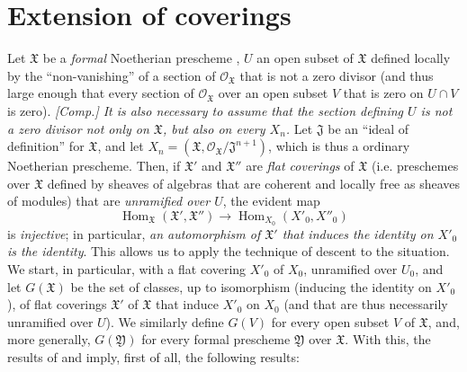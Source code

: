 \documentclass{article}
\newcommand{\scr}[1]{{\mathscr{#1}}}
\newcommand{\fk}[1]{{\mathfrak{#1}}}
\DeclareMathOperator{\Hom}{Hom}
\newcommand{\oldpage}[1]{\marginpar{\footnotesize$\Big\vert$ \textit{p.~#1}}}
\begin{document}
\section{Extension of coverings}
\label{C.5}

Let $\fk{X}$ be a \emph{formal} Noetherian prescheme \cite{2}, $U$ an open subset of $\fk{X}$ defined locally by the ``non-vanishing'' of a section of $\scr{O}_\fk{X}$ that is not a zero divisor (and thus large enough that every section of $\scr{O}_\fk{X}$ over an open subset $V$ that is zero on $U\cap V$ is zero).
\emph{[Comp.] It is also necessary to assume that the section defining $U$ is not a zero divisor not only on $\fk{X}$, but also on every $X_n$.}
Let $\fk{J}$ be an ``ideal of definition'' for $\fk{X}$, and let $X_n=(\fk{X},\scr{O}_\fk{X}/\fk{J}^{n+1})$, which is thus a ordinary Noetherian prescheme.
Then, if $\fk{X}'$ and $\fk{X}''$ are \emph{flat coverings} of $\fk{X}$ (i.e. preschemes over $\fk{X}$ defined by sheaves of algebras that are coherent and locally free as sheaves of modules) that are \emph{unramified over $U$}, the evident map
\[
  \Hom_\fk{X}(\fk{X}',\fk{X}'') \to \Hom_{X_0}(X'_0,X''_0)
\]
is \emph{injective};
in particular, \emph{an automorphism of $\fk{X}'$ that induces the identity on $X'_0$ is the identity}.
This allows us to apply the technique of descent to the situation.
We start, in particular, with a flat covering $X'_0$ of $X_0$, unramified
\oldpage{195-20}
over $U_0$, and let $G(\fk{X})$ be the set of classes, up to isomorphism (inducing the identity on $X'_0$), of flat coverings $\fk{X}'$ of $\fk{X}$ that induce $X'_0$ on $X_0$ (and that are thus necessarily unramified over $U$).
We similarly define $G(V)$ for every open subset $V$ of $\fk{X}$, and, more generally, $G(\fk{Y})$ for every formal prescheme $\fk{Y}$ over $\fk{X}$.
With this, the results of \cite{2} and \cite{3} imply, first of all, the following results:
\end{document}
